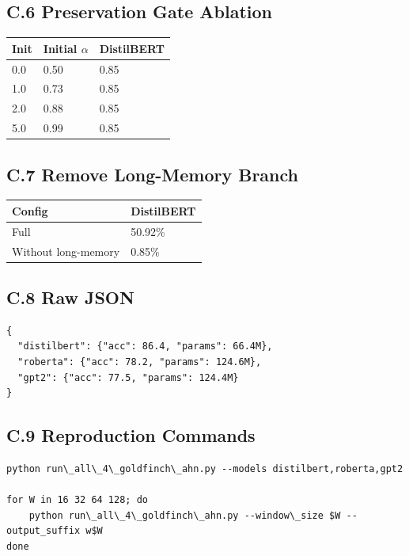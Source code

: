 \subsection{C.6 Preservation Gate Ablation}

\begin{table}[H]
\centering
\small
\begin{tabular}{lll}
\toprule
\textbf{Init} & \textbf{Initial $\alpha$} & \textbf{DistilBERT} \\
\midrule
0.0 & 0.50 & 0.85 \\
1.0 & 0.73 & 0.85 \\
2.0 & 0.88 & 0.85 \\
5.0 & 0.99 & 0.85 \\
\bottomrule
\end{tabular}
\end{table}

\subsection{C.7 Remove Long-Memory Branch}

\begin{table}[H]
\centering
\small
\begin{tabular}{ll}
\toprule
\textbf{Config} & \textbf{DistilBERT} \\
\midrule
Full & 50.92\% \\
Without long-memory & 0.85\% \\
\bottomrule
\end{tabular}
\end{table}

\subsection{C.8 Raw JSON}

\begin{lstlisting}
{
  "distilbert": {"acc": 86.4, "params": 66.4M},
  "roberta": {"acc": 78.2, "params": 124.6M},
  "gpt2": {"acc": 77.5, "params": 124.4M}
}
\end{lstlisting}

\subsection{C.9 Reproduction Commands}

\begin{lstlisting}
python run\_all\_4\_goldfinch\_ahn.py --models distilbert,roberta,gpt2

for W in 16 32 64 128; do
    python run\_all\_4\_goldfinch\_ahn.py --window\_size $W --output_suffix w$W
done
\end{lstlisting}



